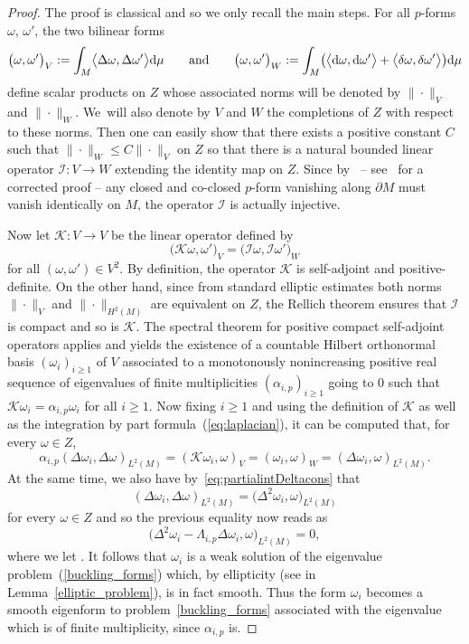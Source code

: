 \documentclass[pdftex]{sigma}
\numberwithin{equation}{section}
\theoremstyle{definition}
\begin{document}
\begin{proof}
The proof is classical and so we only recall the main steps. For all $p$-forms $\omega$, $\omega'$, the two bilinear forms
\[
\bigl(\omega,\omega'\bigr)_V:=\int_M\bigl\langle\Delta\omega,\Delta\omega'\bigr\rangle
{\rm d}\mu \qquad \textrm{and}\qquad \bigl(\omega,\omega'\bigr)_W:=\int_{M}\bigl(
\bigl\langle {\rm d}\omega,{\rm d}\omega'\bigr\rangle+\bigl\langle \delta\omega,\delta\omega'\bigr\rangle\bigr) {\rm d}\mu
\]
define scalar products on $Z$ whose associated norms will be denoted by $\|\cdot\|_V$ and $\|\cdot\|_W$.
We~will also denote by $V$ and $W$ the completions of $Z$ with respect to these norms.
Then one can easily show that there exists a positive constant $C$ such that $\|\cdot\|_W\leq C\|\cdot\|_V$ on $Z$ so that there is a natural bounded linear operator $\mathcal{I}\colon V\rightarrow W$ extending the identity map on $Z$.
Since by~\cite{Anne89} -- see~\cite{ChadrakarGittinsHabibPeyerimhoff2025} for a corrected proof -- any closed and co-closed $p$-form vanishing along $\partial M$ must vanish identically on $M$, the operator $\mathcal{I}$ is actually injective.

Now let $\mathcal{K}\colon V\to V$ be the linear operator defined by
\[
\bigl(\mathcal{K}\omega,\omega'\bigr)_V=\bigl(\mathcal{I}\omega,
\mathcal{I}\omega'\bigr)_W
\]
for all $(\omega,\omega')\in V^2$.
By definition, the operator $\mathcal{K}$ is self-adjoint and positive-definite.
On the other hand, since from standard elliptic estimates both norms $\|\cdot\|_V$ and $\|\cdot\|_{H^2(M)}$ are equivalent on $Z$, the Rellich theorem ensures that $\mathcal{I}$ is compact and so is $\mathcal{K}$.
The spectral theorem for positive compact self-adjoint operators applies and yields the existence of a countable Hilbert or\-tho\-nor\-mal basis $(\omega_i)_{i\geq 1}$ of $V$ associated to a mo\-no\-to\-nous\-ly nonincreasing positive real sequence of eigenvalues of finite multiplicities $(\alpha_{i,p})_{i\geq1}$ going to $0$ such that $\mathcal{K}\omega_i=\alpha_{i,p}\omega_i$ for all $i\geq1$. Now fixing $i\geq 1$ and using the definition of $\mathcal{K}$ as well as the integration by part formula~(\ref{eq:laplacian}), it can be computed that, for every $\omega\in Z$,
\[%
\alpha_{i,p}(\Delta\omega_i,\Delta\omega)_{L^2(M)} =(\mathcal{K}\omega_i,\omega)_V
=(\omega_i,\omega)_W=(\Delta\omega_i,\omega)_{L^2(M)}.
\]
At the same time, we also have by~\eqref{eq:partialintDeltacons} that
\[%
(\Delta\omega_i,\Delta\omega)_{L^2(M)}= \bigl(\Delta^2\omega_i,\omega\bigr)_{L^2(M)}
\]
for every $\omega\in Z$ and so the previous equality now reads as
\[
\bigl(\Delta^2\omega_i-\Lambda_{i,p}\Delta \omega_i,
\omega\bigr)_{L^2(M)}=0,
\]
where we let .
It follows that $\omega_i$ is a weak solution of the eigenvalue problem~(\ref{buckling_forms}) which, by ellipticity (see in Lemma~\ref{elliptic_problem}), is in fact smooth.
Thus the form $\omega_i$ becomes a smooth eigenform to problem~\eqref{buckling_forms} associated with the eigenvalue  which is of finite multiplicity, since $\alpha_{i,p}$ is.


\end{proof}
\end{document}
